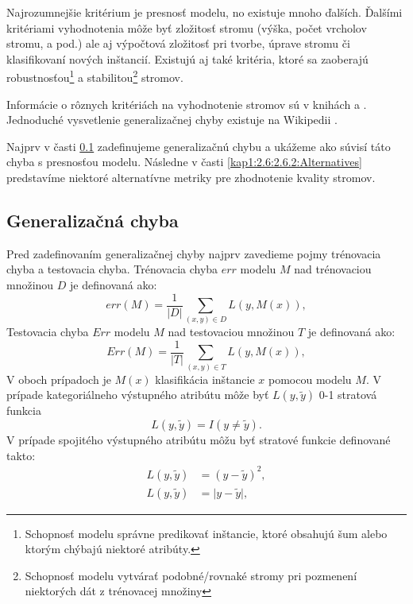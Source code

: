 Najrozumnejšie kritérium je presnosť modelu, no existuje mnoho ďalších. Ďalšími kritériami vyhodnotenia môže byť zložitosť stromu (výška, počet vrcholov stromu, a pod.) ale aj výpočtová zložitosť pri tvorbe, úprave stromu či klasifikovaní nových inštancií. Existujú aj také kritéria, ktoré sa zaoberajú robustnosťou\footnote{Schopnosť modelu správne predikovať inštancie, ktoré obsahujú šum alebo ktorým chýbajú niektoré atribúty.} a stabilitou\footnote{Schopnosť modelu vytvárať podobné/rovnaké stromy pri pozmenení niektorých dát z trénovacej množiny} stromov.

Informácie o rôznych kritériách na vyhodnotenie stromov sú v knihách \cite[s. 364]{kap1-DecisionTree} a \cite[s. 31]{kap1-DataMiningForMasses}. Jednoduché vysvetlenie generalizačnej chyby existuje na Wikipedii \cite{wiki-GeneralizationError}.

Najprv v časti \ref{kap1:2.6:2.6.1:Generalize} zadefinujeme generalizačnú chybu a ukážeme ako súvisí táto chyba s presnosťou modelu. Následne v časti \ref{kap1:2.6:2.6.2:Alternatives} predstavíme niektoré alternatívne metriky pre zhodnotenie kvality stromov.

\subsection{Generalizačná chyba}\label{kap1:2.6:2.6.1:Generalize}
Pred zadefinovaním generalizačnej chyby najprv zavedieme pojmy trénovacia chyba a testovacia chyba.
Trénovacia chyba $err$ modelu $M$ nad trénovaciou množinou $D$ je definovaná ako:
\begin{equation}
err(M) = \dfrac{1}{\lvert D \lvert}\sum_{(x,y) \in D} L(y, M(x)),
\end{equation}
Testovacia chyba $Err$ modelu $M$ nad testovaciou množinou $T$ je definovaná ako:
\begin{equation}
Err(M) = \dfrac{1}{\lvert T \lvert}\sum_{(x,y) \in T} L(y, M(x)),
\end{equation}
V oboch prípadoch je $M(x)$ klasifikácia inštancie $x$ pomocou modelu $M$. V prípade kategoriálneho výstupného atribútu môže byť $L(y,\tilde{y})$ 0-1 stratová funkcia
\begin{equation}
L(y,\tilde{y}) = I(y \ne \tilde{y}).
\end{equation}
V prípade spojitého výstupného atribútu môžu byť stratové funkcie definované takto:
\begin{align}
L(y,\tilde{y}) &= (y - \tilde{y})^2, \nonumber \\
L(y,\tilde{y}) &= \lvert y - \tilde{y} \lvert,
\end{align}

